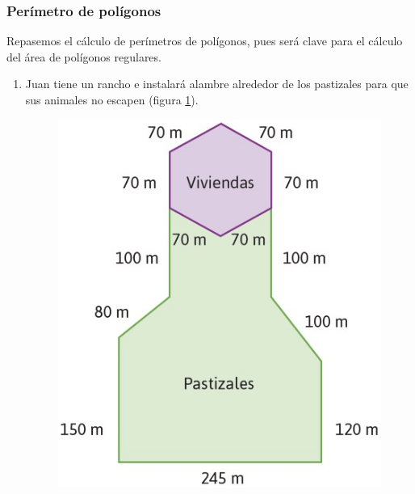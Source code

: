 \documentclass[11pt]{book}
\begin{document}
\subsubsection{Perímetro de polígonos}

Repasemos el cálculo de perímetros de polígonos, pues será clave para el cálculo del área de polígonos regulares.\\

\begin{enumerate}
  \item Juan tiene un rancho e instalará alambre alrededor de los pastizales para que sus animales no escapen (figura \ref{fig:02}).

        \begin{minipage}[t]{0.35\textwidth}
          \begin{figure}[H]
            \centering
            \includegraphics[width=\linewidth]{02.jpg}
            \label{fig:02}
          \end{figure}
        \end{minipage}\hfill
        \begin{minipage}[t]{0.55\textwidth}

\end{minipage}
\end{enumerate}
\end{document}
